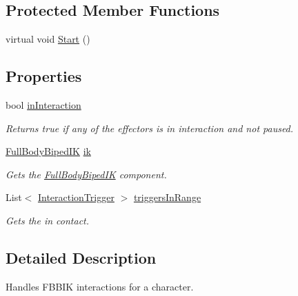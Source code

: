 \subsection*{Protected Member Functions}
\begin{DoxyCompactItemize}
\item 
virtual void \mbox{\hyperlink{class_root_motion_1_1_final_i_k_1_1_interaction_system_a354ce0af6ee29e77cbaf892029585de1}{Start}} ()
\end{DoxyCompactItemize}
\subsection*{Properties}
\begin{DoxyCompactItemize}
\item 
bool \mbox{\hyperlink{class_root_motion_1_1_final_i_k_1_1_interaction_system_a0769374cb412651cc5067066436e80a6}{in\+Interaction}}
\begin{DoxyCompactList}\small\item\em Returns true if any of the effectors is in interaction and not paused. \end{DoxyCompactList}\item 
\mbox{\hyperlink{class_root_motion_1_1_final_i_k_1_1_full_body_biped_i_k}{Full\+Body\+Biped\+IK}} \mbox{\hyperlink{class_root_motion_1_1_final_i_k_1_1_interaction_system_ac1fe649bfc257a53bcf52925fb82066d}{ik}}
\begin{DoxyCompactList}\small\item\em Gets the \mbox{\hyperlink{class_root_motion_1_1_final_i_k_1_1_full_body_biped_i_k}{Full\+Body\+Biped\+IK}} component. \end{DoxyCompactList}\item 
List$<$ \mbox{\hyperlink{class_root_motion_1_1_final_i_k_1_1_interaction_trigger}{Interaction\+Trigger}} $>$ \mbox{\hyperlink{class_root_motion_1_1_final_i_k_1_1_interaction_system_ae42cf567290135b38026f338f5ae17e9}{triggers\+In\+Range}}
\begin{DoxyCompactList}\small\item\em Gets the in contact. \end{DoxyCompactList}\end{DoxyCompactItemize}


\subsection{Detailed Description}
Handles F\+B\+B\+IK interactions for a character. 



